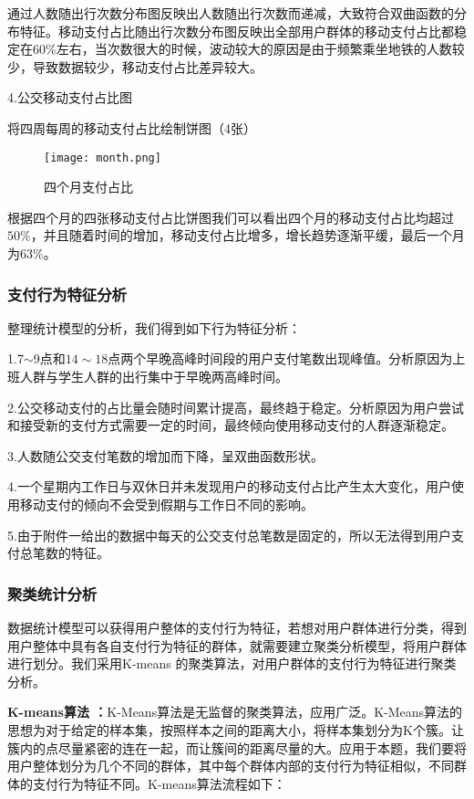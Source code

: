 \documentclass[withoutpreface,bwprint]{cumcmthesis} %
\begin{document}
通过人数随出行次数分布图反映出人数随出行次数而递减，大致符合双曲函数的分布特征。移动支付占比随出行次数分布图反映出全部用户群体的移动支付占比都稳定在60\%左右，当次数很大的时候，波动较大的原因是由于频繁乘坐地铁的人数较少，导致数据较少，移动支付占比差异较大。

4.公交移动支付占比图

将四周每周的移动支付占比绘制饼图（4张）
\begin{figure}[h]
\centering
\texttt{[image: month.png]}
\caption{四个月支付占比}
\end{figure}

根据四个月的四张移动支付占比饼图我们可以看出四个月的移动支付占比均超过$50\%$，并且随着时间的增加，移动支付占比增多，增长趋势逐渐平缓，最后一个月为63\%。
\subsubsection{支付行为特征分析}
整理统计模型的分析，我们得到如下行为特征分析：

1.7$\sim$9点和$14\sim18$点两个早晚高峰时间段的用户支付笔数出现峰值。分析原因为上班人群与学生人群的出行集中于早晚两高峰时间。

2.公交移动支付的占比量会随时间累计提高，最终趋于稳定。分析原因为用户尝试和接受新的支付方式需要一定的时间，最终倾向使用移动支付的人群逐渐稳定。

3.人数随公交支付笔数的增加而下降，呈双曲函数形状。

4.一个星期内工作日与双休日并未发现用户的移动支付占比产生太大变化，用户使用移动支付的倾向不会受到假期与工作日不同的影响。

5.由于附件一给出的数据中每天的公交支付总笔数是固定的，所以无法得到用户支付总笔数的特征。

\subsubsection{聚类统计分析}
数据统计模型可以获得用户整体的支付行为特征，若想对用户群体进行分类，得到用户整体中具有各自支付行为特征的群体，就需要建立聚类分析模型，将用户群体进行划分。我们采用K-means 的聚类算法，对用户群体的支付行为特征进行聚类分析。

\textbf{K-means算法 ：}K-Means算法是无监督的聚类算法，应用广泛。K-Means算法的思想为对于给定的样本集，按照样本之间的距离大小，将样本集划分为K个簇。让簇内的点尽量紧密的连在一起，而让簇间的距离尽量的大。应用于本题，我们要将用户整体划分为几个不同的群体，其中每个群体内部的支付行为特征相似，不同群体的支付行为特征不同。K-means算法流程如下：
\end{document}
